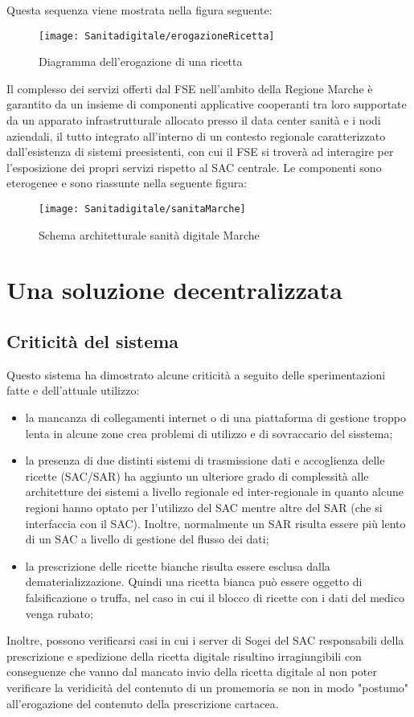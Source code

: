 Questa sequenza viene mostrata nella figura seguente:
%
\begin{figure}[H]
	\centering
	\texttt{[image: Sanitadigitale/erogazioneRicetta]}
	\caption{Diagramma dell'erogazione di una ricetta}
	\label{fig:Erogazione di una ricetta dematerializzata}
\end{figure}
%
Il complesso dei servizi offerti dal FSE nell'ambito della Regione Marche è garantito da un insieme di componenti applicative cooperanti tra loro supportate da un apparato infrastrutturale allocato presso il data center sanità e i nodi aziendali, il tutto integrato all’interno di un contesto regionale caratterizzato dall’esistenza di sistemi preesistenti, con cui il FSE si troverà ad interagire  per l’esposizione dei propri servizi rispetto al SAC centrale. Le componenti sono eterogenee e sono riassunte nella seguente figura:
%
\begin{figure}[H]
	\centering
	\texttt{[image: Sanitadigitale/sanitaMarche]}
	\caption{Schema architetturale sanità digitale Marche}
	\label{fig:Schema architetturale sanità digitale Marche}
	\vfill
\end{figure}
%
\section{Una soluzione decentralizzata}
%
\subsection{Criticità del sistema}
Questo sistema ha dimostrato alcune criticità a seguito delle sperimentazioni fatte e dell'attuale utilizzo:
\begin{itemize}
	\item la mancanza di collegamenti internet o di una piattaforma di gestione troppo lenta in alcune zone crea problemi di utilizzo e di sovraccario del sisstema;
	\item la presenza di due distinti sistemi di trasmissione dati e accoglienza delle ricette (SAC/SAR) ha aggiunto un ulteriore grado di complessità alle architetture dei sistemi a livello regionale ed inter-regionale in quanto alcune regioni hanno optato per l'utilizzo del SAC mentre altre del SAR (che si interfaccia con il SAC). Inoltre, normalmente un SAR risulta essere più lento di un SAC a livello di gestione del flusso dei dati;
	\item la prescrizione delle ricette bianche risulta essere esclusa dalla dematerializzazione. Quindi una ricetta bianca può essere oggetto di falsificazione o truffa, nel caso in cui il blocco di ricette con i dati del medico venga rubato;
\end{itemize}
Inoltre, possono verificarsi casi in cui i server di Sogei del SAC responsabili della prescrizione e spedizione della ricetta digitale risultino irragiungibili con conseguenze che vanno dal mancato invio della ricetta digitale al non poter verificare la veridicità del contenuto di un promemoria se non in modo "postumo" all'erogazione del contenuto della prescrizione cartacea.
%
